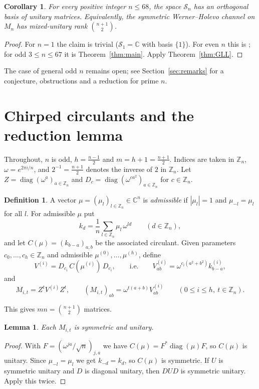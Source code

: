\documentclass[11pt]{amsart}
\newtheorem{lemma}[theorem]{Lemma}
\newtheorem{corollary}[theorem]{Corollary}
\theoremstyle{definition}
\newtheorem{definition}[theorem]{Definition}
\theoremstyle{remark}
\newcommand{\Z}{\mathbb{Z}}
\newcommand{\C}{\mathbb{C}}
\newcommand{\Sym}{\mathcal{S}}
\begin{document}
\begin{corollary}\label{cor:main}
For every positive integer $n\le 68$, the space $\Sym_n$ has an orthogonal basis of unitary matrices. Equivalently, the symmetric Werner--Holevo channel on $M_n$ has mixed-unitary rank $\binom{n+1}{2}$.
\end{corollary}

\begin{proof}
For $n=1$ the claim is trivial ($\Sym_1=\C$ with basis $\{1\}$). For even $n$ this is \cite[Theorem~21]{GLL22}; for odd $3\le n\le 67$ it is Theorem~\ref{thm:main}. Apply Theorem~\ref{thm:GLL}.
\end{proof}

The case of general odd $n$ remains open; see Section~\ref{sec:remarks} for a conjecture, obstructions and a reduction for prime $n$.

\section{Chirped circulants and the reduction lemma}\label{sec:family}

Throughout, $n$ is odd, $h=\frac{n-1}{2}$ and $m=h+1=\frac{n+1}{2}$. Indices are taken in $\Z_n$, $\omega=e^{2\pi i/n}$, and $2^{-1}=\frac{n+1}{2}$ denotes the inverse of $2$ in $\Z_n$. Let $Z=\operatorname{diag}(\omega^a)_{a\in\Z_n}$ and $D_c=\operatorname{diag}(\omega^{ca^2})_{a\in\Z_n}$ for $c\in\Z_n$.

\begin{definition}
A vector $\mu=(\mu_l)_{l\in\Z_n}\in\C^n$ is \emph{admissible} if $|\mu_l|=1$ and $\mu_{-l}=\mu_l$ for all $l$. For admissible $\mu$ put
\[
k_d=\frac1n\sum_{l\in\Z_n}\mu_l\,\omega^{ld}\qquad(d\in\Z_n),
\]
and let $C(\mu)=(k_{b-a})_{a,b}$ be the associated circulant.
Given parameters $c_0,\dots,c_h\in\Z_n$ and admissible $\mu^{(0)},\dots,\mu^{(h)}$, define
\[
V^{(i)}=D_{c_i}\,C(\mu^{(i)})\,D_{c_i},\qquad\text{i.e.}\qquad V^{(i)}_{ab}=\omega^{c_i(a^2+b^2)}k^{(i)}_{b-a},
\]
and
\[
M_{i,t}=Z^tV^{(i)}Z^t,\qquad (M_{i,t})_{ab}=\omega^{t(a+b)}V^{(i)}_{ab}\qquad(0\le i\le h,\ t\in\Z_n).
\]
\end{definition}

This gives $mn=\binom{n+1}{2}$ matrices.

\begin{lemma}\label{lem:symunit}
Each $M_{i,t}$ is symmetric and unitary.
\end{lemma}

\begin{proof}
With $F=(\omega^{ja}/\sqrt n)_{j,a}$ we have $C(\mu)=F^*\operatorname{diag}(\mu)F$, so $C(\mu)$ is unitary. Since $\mu_{-l}=\mu_l$ we get $k_{-d}=k_d$, so $C(\mu)$ is symmetric. If $U$ is symmetric unitary and $D$ is diagonal unitary, then $DUD$ is symmetric unitary. Apply this twice.
\end{proof}
\end{document}

